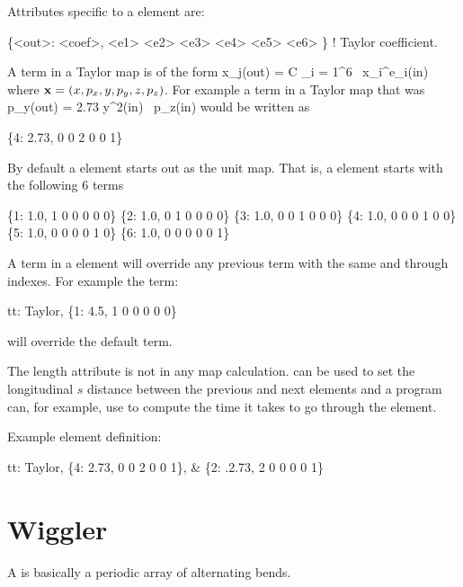 {Attributes specific to a  element are:
\begin{example}
  \{<out>: <coef>, <e1> <e2> <e3> <e4> <e5> <e6> \}  ! Taylor coefficient. 
\end{example}

A term in a Taylor map is of the form
\Begineq
  x_j({\rm out}) = C \cdot \Pi_{i = 1}^6 \, x_i^{e_i}({\rm in})
\Endeq
where ${\bf x} = (x, p_x, y, p_y, z, p_z)$. For example a term
in a Taylor map that was
\Begineq
  p_y({\rm out}) = 2.73 \cdot y^2({\rm in}) \, p_z({\rm in})
\Endeq
would be written as
\begin{example}
  \{4: 2.73, 0 0 2 0 0 1\}
\end{example}

By default a  element starts out as the unit map. 
That is, a  element starts with the following 6 terms
\begin{example}
  \{1: 1.0, 1 0 0 0 0 0\}
  \{2: 1.0, 0 1 0 0 0 0\}
  \{3: 1.0, 0 0 1 0 0 0\}
  \{4: 1.0, 0 0 0 1 0 0\}
  \{5: 1.0, 0 0 0 0 1 0\}
  \{6: 1.0, 0 0 0 0 0 1\}
\end{example}
A term in a  element will override any previous term
with the same  and  through  indexes. For example the term:
\begin{example}
  tt: Taylor, \{1: 4.5, 1 0 0 0 0 0\} 
\end{example}
will override the default  term.

The  length attribute is not in any map calculation.  can
be used to set the longitudinal $s$ distance between the previous and
next elements and a program can, for example, use  to compute
the time it takes to go through the element.

Example  element definition:
\begin{example}
  tt: Taylor, \{4:  2.73, 0 0 2 0 0 1\}, &
              \{2: .2.73, 2 0 0 0 0 1\}
\end{example}

\section{Wiggler} 
\label{s:wiggler}

A  is basically a periodic array of alternating bends.

}
